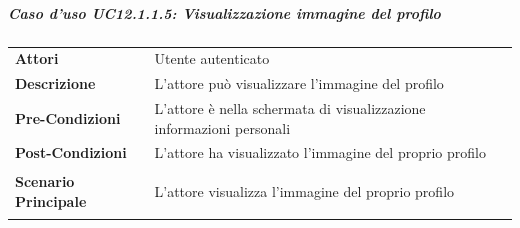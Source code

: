 \subparagraph{Caso d'uso UC12.1.1.5: Visualizzazione immagine del profilo}
\label{UC12_1_1_5}
\begin{minipage}{\linewidth}
	\begin{tabular}{ l | p{11cm}}
		\hline
		\rowcolor{Gray}
		\multicolumn{2}{c}{UC12.1.1.5 - Visualizzazione immagine del profilo} \\
		\hline
		\textbf{Attori} & Utente autenticato \\
		\textbf{Descrizione} & L'attore può visualizzare l'immagine del profilo\\
		\textbf{Pre-Condizioni} & L'attore è nella schermata di visualizzazione informazioni personali\\
		\textbf{Post-Condizioni} & L'attore ha visualizzato l'immagine del proprio profilo \\
		\textbf{Scenario Principale} & 
		\begin{enumerate*}[label=(\arabic*.),itemjoin={\newline}]
			\item L'attore visualizza l'immagine del proprio profilo
		\end{enumerate*}
	\end{tabular}
\end{minipage}

\newpage
